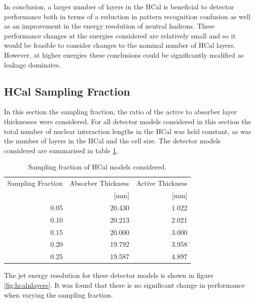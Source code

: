 In conclusion, a larger number of layers in the HCal is beneficial to detector performance both in terms of a reduction in pattern recognition confusion as well as an improvement in the energy resolution of neutral hadrons.  These performance changes at the energies considered are relatively small and so it would be feasible to consider changes to the nominal number of HCal layers.  However, at higher energies these conclusions could be significantly modified as leakage dominates.  


\subsection{HCal Sampling Fraction}
\label{sec:hcalsamplingfraction}
In this section the sampling fraction, the ratio of the active to absorber layer thicknesses were considered.  For all detector models considered in this section the total number of nuclear interaction lengths in the HCal was held constant, as was the number of layers in the HCal and the cell size.  The detector models considered are summarised in table \ref{table:hcalsamplingfraction}. 

\begin{table}[h!]
\centering
\begin{tabular}{ r r r }
\hline
Sampling Fraction & Absorber Thickness & Active Thickness \\
 & [mm] & [mm] \\
\hline
0.05 & 20.430 & 1.022 \\ 
0.10 & 20.213 & 2.021 \\
0.15 & 20.000 & 3.000 \\
0.20 & 19.792 & 3.958 \\
0.25 & 19.587 & 4.897 \\
\hline
\end{tabular}
\caption[Sampling fraction of HCal models considered.]{Sampling fraction of HCal models considered.}
\label{table:hcalsamplingfraction}
\end{table}

The jet energy resolution for these detector models is shown in figure \ref{fig:hcalnlayers}.  It was found that there is no significant change in performance when varying the sampling fraction.  

